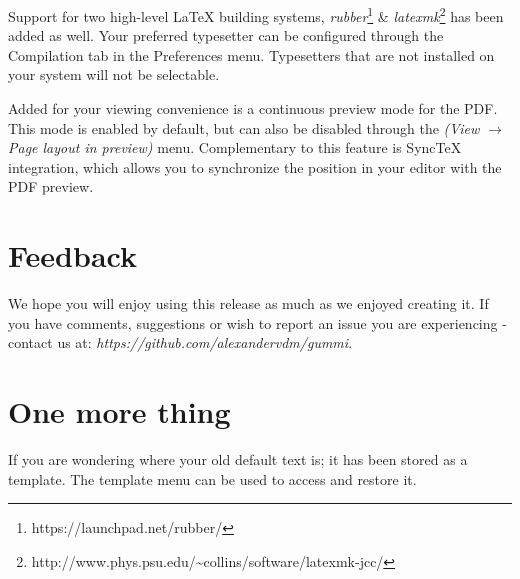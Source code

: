 \documentclass[11pt]{article}
\begin{document}
Support for two high-level {\LaTeX} building systems, \emph{rubber}\footnote{https://launchpad.net/rubber/} \& \emph{latexmk}\footnote{http://www.phys.psu.edu/{\textasciitilde}collins/software/latexmk-jcc/} has been added as well. Your preferred typesetter can be configured through the Compilation tab in the Preferences menu. Typesetters that are not installed on your system will not be selectable. 

Added for your viewing convenience is a continuous preview mode for the PDF. This mode is enabled by default, but can also be disabled through the \emph{(View $\rightarrow$ Page layout in preview)} menu. Complementary to this feature is SyncTeX integration, which allows you to synchronize the position in your editor with the PDF preview. 

\section{Feedback}
We hope you will enjoy using this release as much as we enjoyed creating it. If you have comments, suggestions or wish to report an issue you are experiencing - contact us at: \emph{https://github.com/alexandervdm/gummi}.

\section{One more thing}
If you are wondering where your old default text is; it has been stored as a template. The template menu can be used to access and restore it. 
\end{document}
